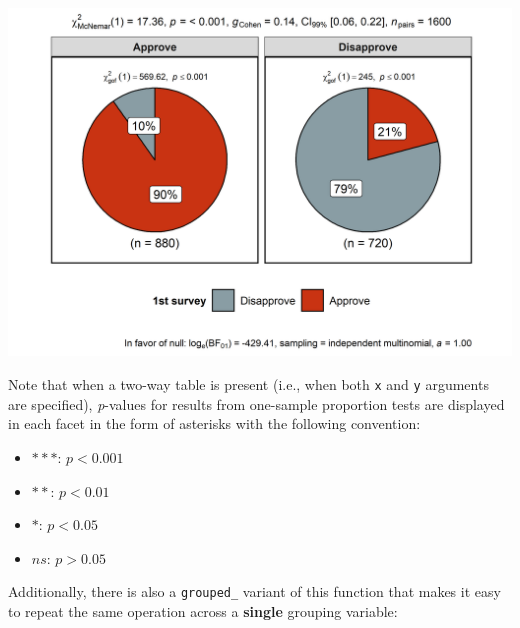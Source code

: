 \documentclass[]{article}
\providecommand{\tightlist}{%
  \setlength{\itemsep}{0pt}\setlength{\parskip}{0pt}}
\begin{document}
\includegraphics[width=1\linewidth]{./figures/paper-ggpiestats3-1}

Note that when a two-way table is present (i.e., when both \texttt{x} and
\texttt{y} arguments are specified), \emph{p}-values for results from one-sample
proportion tests are displayed in each facet in the form of asterisks with the
following convention:

\begin{itemize}
\tightlist
\item
  \(***\): \(p < 0.001\)
\item
  \(**\): \(p < 0.01\)
\item
  \(*\): \(p < 0.05\)
\item
  \(ns\): \(p > 0.05\)
\end{itemize}

Additionally, there is also a \texttt{grouped\_} variant of this function that makes it
easy to repeat the same operation across a \textbf{single} grouping variable:
\end{document}
